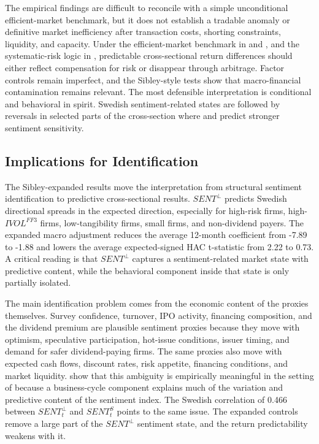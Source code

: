 \documentclass[11pt]{article}
\newcommand{\var}[1]{\ensuremath{#1}}
\begin{document}
The empirical findings are difficult to reconcile with a simple unconditional efficient-market benchmark, but it does not establish a tradable anomaly or definitive market inefficiency after transaction costs, shorting constraints, liquidity, and capacity. Under the efficient-market benchmark in \citet{fama1970efficient} and \citet{fama1991efficient}, and the systematic-risk logic in \citet{sharpe1964capital}, predictable cross-sectional return differences should either reflect compensation for risk or disappear through arbitrage. Factor controls remain imperfect, and the Sibley-style tests show that macro-financial contamination remains relevant. The most defensible interpretation is conditional and behavioral in spirit. Swedish sentiment-related states are followed by reversals in selected parts of the cross-section where \citet{baker2006sentiment} and \citet{stambaugh2012short} predict stronger sentiment sensitivity.

\subsection{Implications for Identification}
The Sibley-expanded results move the interpretation from structural sentiment identification to predictive cross-sectional results. \var{SENT^{\perp}} predicts Swedish directional spreads in the expected direction, especially for high-risk firms, high-\var{IVOL^{FF3}} firms, low-tangibility firms, small firms, and non-dividend payers. The expanded macro adjustment reduces the average 12-month coefficient from -7.89 to -1.88 and lowers the average expected-signed HAC t-statistic from 2.22 to 0.73. A critical reading is that \var{SENT^{\perp}} captures a sentiment-related market state with predictive content, while the behavioral component inside that state is only partially isolated.

The main identification problem comes from the economic content of the proxies themselves. Survey confidence, turnover, IPO activity, financing composition, and the dividend premium are plausible sentiment proxies because they move with optimism, speculative participation, hot-issue conditions, issuer timing, and demand for safer dividend-paying firms. The same proxies also move with expected cash flows, discount rates, risk appetite, financing conditions, and market liquidity. \citet{sibley2012sentimental} show that this ambiguity is empirically meaningful in the setting of \citet{baker2006sentiment} because a business-cycle component explains much of the variation and predictive content of the sentiment index. The Swedish correlation of 0.466 between \var{SENT^{\perp}_{t}} and \var{SENT^{S}_{t}} points to the same issue. The expanded controls remove a large part of the \var{SENT^{\perp}} sentiment state, and the return predictability weakens with it.
\end{document}
